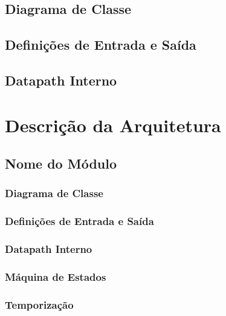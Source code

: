 \documentclass{report}
\begin{document}
  \section{Diagrama de Classe}

  \section{Definições de Entrada e Saída}

  \section{Datapath Interno}

\chapter{Descrição da Arquitetura}

  \section{Nome do Módulo}

    \subsection{Diagrama de Classe}

    \subsection{Definições de Entrada e Saída}

    \subsection{Datapath Interno}

    \subsection{Máquina de Estados}

    \subsection{Temporização}


% 
% 
\end{document}
